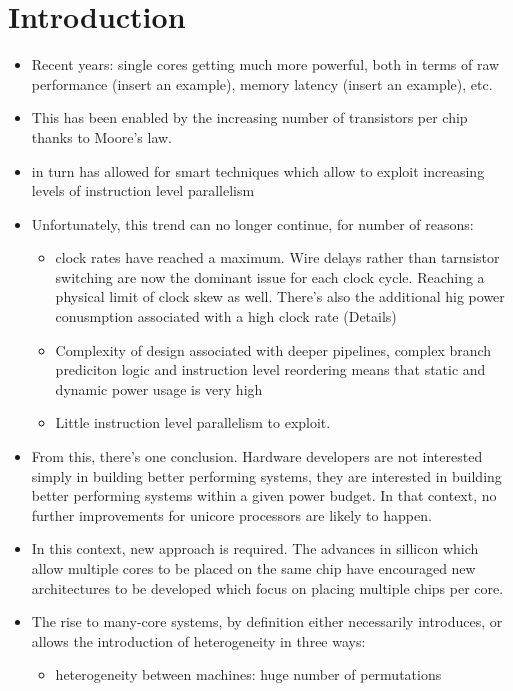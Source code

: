\section{Introduction}

\begin{itemize}
\item Recent years: single cores getting much more powerful,
both in terms of raw performance (insert an example), 
memory latency (insert an example), etc.
\item This has been enabled by the increasing
number of transistors per chip thanks to Moore's law. 
\item in turn has allowed for 
smart techniques which allow to exploit increasing
levels of instruction level parallelism 
\item Unfortunately, this trend can no longer
continue, for number of reasons:
\begin{itemize}
\item clock rates have reached a maximum. Wire delays
rather than tarnsistor switching are now the dominant
issue for each clock cycle. Reaching a physical limit of clock
skew as well.  
There's also the additional hig power conusmption associated
with a high clock rate (Details) 
\item Complexity of design associated with deeper pipelines,
complex branch prediciton logic and instruction level reordering
means that static and dynamic power usage is very high
\item Little instruction level parallelism to exploit.  
\end{itemize}
\item From this, there's one conclusion. Hardware developers are not 
interested simply in building better performing systems, they 
are interested in building better performing systems within a given
power budget. In that context, no further improvements for unicore
processors are likely to happen. 
\item In this context, new approach is required. The advances
in sillicon which allow multiple cores to be placed on the same
chip have encouraged new architectures to be developed
which focus on placing multiple chips per core. 
\item The rise to many-core systems, by definition either necessarily 
introduces, or allows the introduction of heterogeneity in three ways: 
\begin{itemize}
\item heterogeneity between machines: huge number of permutations

\end{itemize}
\end{itemize}
